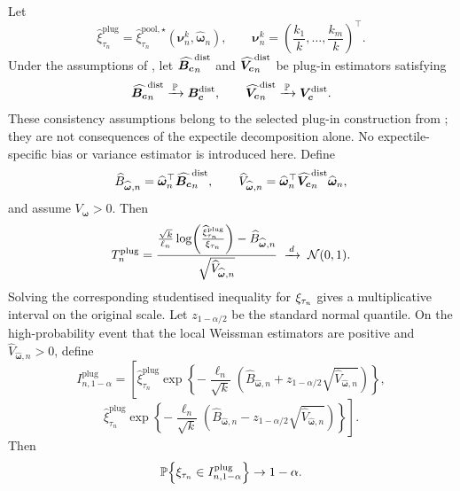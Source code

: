 \begin{conjecture}
\label{conj:pool-ext:plugin-inference}
Let
\[
  \widehat\xi_{\tau_n}^{\mathrm{plug}}
  =
  \widehat\xi_{\tau_n}^{\mathrm{pool},\star}
  (\bm\nu_n^k,\widehat{\bm\omega}_n),
  \qquad
  \bm\nu_n^k=
  \left(\frac{k_1}{k},\ldots,\frac{k_m}{k}\right)^\top.
\]
Under the assumptions of , let
\(\widehat{\bm{B}_{\bm{c}}}^{\mathrm{dist}}_n\) and
\(\widehat{\bm{V}_{\bm{c}}}^{\mathrm{dist}}_n\) be plug-in estimators satisfying
\[
  \widehat{\bm{B}_{\bm{c}}}^{\mathrm{dist}}_n\xrightarrow{\,\operatorname{\mathbb{P}}\,}\bm{B}_{\bm{c}}^{\mathrm{dist}},
  \qquad
  \widehat{\bm{V}_{\bm{c}}}^{\mathrm{dist}}_n\xrightarrow{\,\operatorname{\mathbb{P}}\,}\bm{V}_{\bm{c}}^{\mathrm{dist}}.
\]
These consistency assumptions belong to the selected plug-in construction from
\textcite[\S2.2 and Corollary~1; Corollaries~6--7]{DaouiaPadoanStupfler2021};
they are not consequences of the expectile decomposition alone. No
expectile-specific bias or variance estimator is introduced here.
Define
\[
  \widehat B_{\widehat{\bm\omega},n}
  =
  \widehat{\bm\omega}_n^\top\widehat{\bm{B}_{\bm{c}}}^{\mathrm{dist}}_n,
  \qquad
  \widehat V_{\widehat{\bm\omega},n}
  =
  \widehat{\bm\omega}_n^\top
  \widehat{\bm{V}_{\bm{c}}}^{\mathrm{dist}}_n
  \widehat{\bm\omega}_n,
\]
and assume \(V_{\bm\omega}>0\). Then
\[
  T_n^{\mathrm{plug}}
  =
  \frac{
    \frac{\sqrt{k}}{\ell_n}
    \log\!\left(
      \frac{\widehat\xi_{\tau_n}^{\mathrm{plug}}}
           {\xi_{\tau_n}}
    \right)
    -
    \widehat B_{\widehat{\bm\omega},n}
  }{
    \sqrt{\widehat V_{\widehat{\bm\omega},n}}
  }
	  \;\xrightarrow{\,d\,}\;
	  \mathcal N(0,1).
\]
Solving the corresponding studentised inequality for
\(\xi_{\tau_n}\) gives a multiplicative interval on the original scale.
Let \(z_{1-\alpha/2}\) be the standard normal quantile. On the
high-probability event that the local Weissman estimators are positive and
\(\widehat V_{\widehat{\bm\omega},n}>0\), define
\[
  I_{n,1-\alpha}^{\mathrm{plug}}
  =
  \left[
  \widehat\xi_{\tau_n}^{\mathrm{plug}}
  \exp\!\left\{
    -\frac{\ell_n}{\sqrt{k}}
    \left(
      \widehat B_{\widehat{\bm\omega},n}
      +
      z_{1-\alpha/2}\sqrt{\widehat V_{\widehat{\bm\omega},n}}
    \right)
  \right\},
  \right.
\]
\[
  \left.
  \widehat\xi_{\tau_n}^{\mathrm{plug}}
  \exp\!\left\{
    -\frac{\ell_n}{\sqrt{k}}
    \left(
      \widehat B_{\widehat{\bm\omega},n}
      -
      z_{1-\alpha/2}\sqrt{\widehat V_{\widehat{\bm\omega},n}}
    \right)
  \right\}
  \right].
\]
Then
\[
  \operatorname{\mathbb{P}}\!\left\{
    \xi_{\tau_n}\in I_{n,1-\alpha}^{\mathrm{plug}}
  \right\}
  \to
  1-\alpha.
\]
\end{conjecture}

